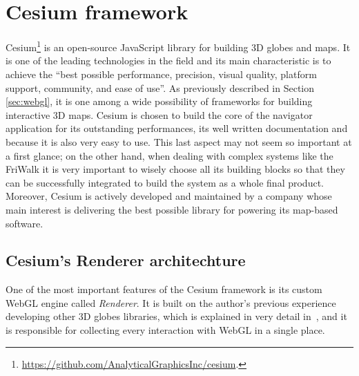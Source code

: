\section{Cesium framework} \label{sec:cesium}
Cesium\footnote{\url{https://github.com/AnalyticalGraphicsInc/cesium}.} is an
open-source JavaScript library for building 3D globes and maps.
It is one of the leading technologies in the
field and its main characteristic is to achieve the ``best possible performance,
precision, visual quality, platform support, community, and ease of use''.
As previously described in Section \ref{sec:webgl}, it is one among a wide
possibility of frameworks for building interactive 3D maps. Cesium is chosen to
build the core of the navigator application for its outstanding performances,
its well written documentation and because it is also very easy to use. This last aspect
may not seem so important at a first glance; on the other hand, when dealing with
complex systems like the FriWalk it is very important to wisely choose all its building
blocks so that they can be successfully integrated to build the system as a whole
final product. Moreover, Cesium is actively developed and maintained by a company
whose main interest is delivering the best possible library for powering its
map-based software.

\subsection{Cesium's Renderer architechture}
One of the most important features of the Cesium framework is its custom WebGL engine
called \emph{Renderer}.
It is built on the author's previous experience developing
other 3D globes libraries, which is explained in very detail in~\cite{cozzi20113d},
and it is responsible for collecting every interaction with WebGL in a single place.

